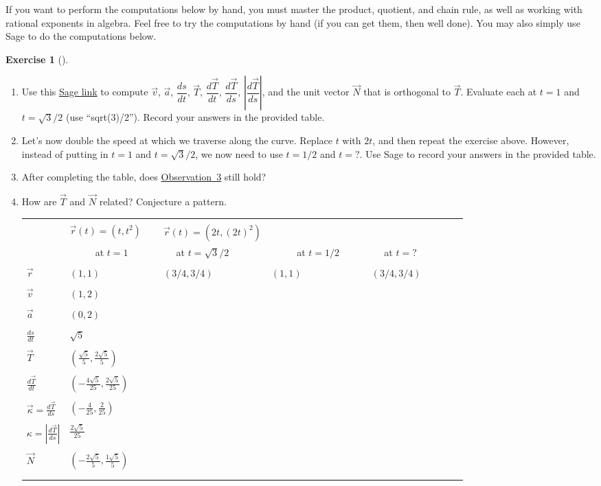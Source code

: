 \documentclass[10pt,]{book}
\theoremstyle{plain}
\theoremstyle{definition}
\theoremstyle{definition}
\theoremstyle{definition}
\theoremstyle{definition}
\newtheorem{exploration}[project]{Exercise}
\theoremstyle{definition}
\numberwithin{equation}{section}
\newcommand{\hrulethin}  {\noalign{\hrule height 0.04em}}
\newcommand{\sageurlforcurvature}{http://bmw.byuimath.com/dokuwiki/doku.php?id=curvature_calculator}
\begin{document}
\par
If you want to perform the computations below by hand, you must master the product, quotient, and chain rule, as well as working with rational exponents in algebra. Feel free to try the computations by hand (if you can get them, then well done). You may also simply use Sage to do the computations below.%
\begin{exploration}[]\label{exploration-174}
\leavevmode%
\begin{enumerate}[font=\bfseries,label=(\alph*),ref=\alph*]
\item\label{task-424} Use this \href{\\sageurlforcurvature}{Sage link} to compute \(\vec v\), \(\vec a\), \(\dfrac{ds}{dt}\), \(\vec T\), \(\dfrac{d\vec T}{dt}\), \(\dfrac{d\vec T}{ds}\), \(\left|\dfrac{d\vec T}{ds}\right|\), and the unit vector \(\vec N\) that is orthogonal to \(\vec T\). Evaluate each at \(t=1\) and \(t=\sqrt{3}/2\) (use ``sqrt(3)/2''). Record your answers in the provided table.%
\item\label{task-425} Let's now double the speed at which we traverse along the curve. Replace \(t\) with \(2t\), and then repeat the exercise above. However, instead of putting in \(t=1\) and \(t=\sqrt{3}/2\), we now need to use \(t=1/2\) and \(t=?\). Use Sage to record your answers in the provided table.%
\item\label{task-426} After completing the table, does \hyperref[curvature_observations]{Observation~3} still hold?%
\item\label{task-427} How are \(\vec T\) and \(\vec N\) related?  Conjecture a pattern. \begin{tabular}{lllll}
&&&&\tabularnewline\hrulethin
\multirow{2}{*}{Value}&\(\vec r(t)=(t,t^2)\)&\(\vec r(t)=(2t,(2t)^2)\)\tabularnewline[0pt]
&~~ ~~ at \(t=1\) ~~ ~~&~~ at \(t=\sqrt3/2\)~~ ~~&~~ ~~ at \(t=1/2\)~~ ~~&~~ at \(t=?\)~~~~~~ ~~\tabularnewline[0pt]
&&&&\tabularnewline\hrulethin
\(\vec r\)&\((1,1)\)&\((3/4,3/4)\)&\((1,1)\)&\((3/4,3/4)\)\tabularnewline[0pt]
&&&&\tabularnewline\hrulethin
\(\vec v\)&\((1,2)\)&&&\tabularnewline[0pt]
&&&&\tabularnewline\hrulethin
\(\vec a\)&\((0,2)\)&&&\tabularnewline[0pt]
&&&&\tabularnewline\hrulethin
\(\frac{ds}{dt}\)&\(\sqrt{5}\)&&&\tabularnewline[0pt]
&&&&\tabularnewline\hrulethin
\(\vec T\)&\((\frac{\sqrt{5}}{5},\frac{2\sqrt{5}}{5})\)&&&\tabularnewline[0pt]
&&&&\tabularnewline\hrulethin
\(\frac{d\vec T}{dt}\)&\((-\frac{4\sqrt{5}}{25},\frac{2\sqrt{5}}{25})\)&&&\tabularnewline[0pt]
&&&&\tabularnewline\hrulethin
\(\vec\kappa=\frac{d\vec T}{ds}\)&\((-\frac{4}{25},\frac{2}{25})\)&&&\tabularnewline[0pt]
&&&&\tabularnewline\hrulethin
\(\kappa=\left|\frac{d\vec T}{ds}\right|\)&\(\frac{2\sqrt{5}}{25}\)&&&\tabularnewline[0pt]
&&&&\tabularnewline\hrulethin
\(\vec N\)&\((-\frac{2\sqrt{5}}{5},\frac{1\sqrt{5}}{5})\)&&&\tabularnewline[0pt]
&&&&\tabularnewline\hrulethin
\end{tabular}
%
\end{enumerate}
\end{exploration}
\end{document}
